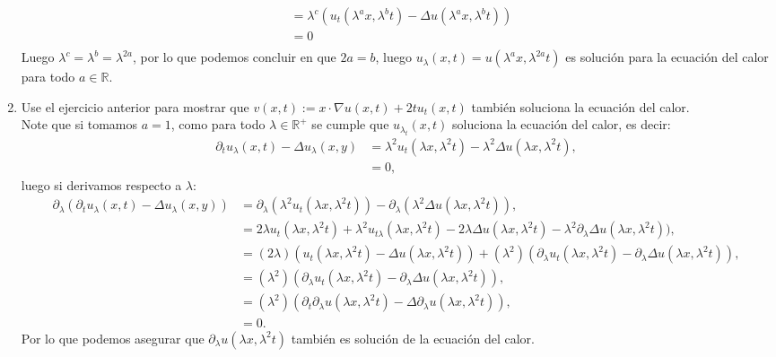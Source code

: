 \begin{homeworkProblem}
\begin{solucion}
\begin{enumerate}
\begin{align*}
          &=\lambda^c(u_{t}(\lambda^ax,\lambda^bt)-\Delta u(\lambda^ax,\lambda^bt))\\
          &=0\\
        \end{align*}
        Luego $\lambda^c=\lambda^b=\lambda^{2a}$, por lo que podemos concluir en que $2a=b$, luego $u_{\lambda}(x,t)=u(\lambda^{a}x,\lambda^{2a}t)$ es solución para la ecuación del calor para todo $a\in \mathbb{R}$.
        \demostrado
        \newpage
      \item Use el ejercicio anterior para mostrar que $v(x,t):=x\cdot \nabla u(x,t)+2tu_t(x,t)$ también soluciona la ecuación del calor.\\
        Note que si tomamos $a=1$, como para todo $\lambda\in\mathbb{R}^{+}$ se cumple que $u_{\lambda_{t}}(x,t)$ soluciona la ecuación del calor, es decir:
        \begin{align*}
          \partial_{t}u_{\lambda}(x,t)-\Delta u_{\lambda}(x,y)&=\lambda^2u_t(\lambda x,\lambda^2t)-\lambda^2\Delta u(\lambda x,\lambda^2 t),\\
          &=0,
        \end{align*}
        luego si derivamos respecto a $\lambda$:
        \begin{align*}
          \partial_{\lambda}(\partial_{t}u_{\lambda}(x,t)-\Delta u_{\lambda}(x,y))&=\partial_{\lambda}(\lambda^2u_t(\lambda x,\lambda^2t))-\partial_{\lambda}(\lambda^2\Delta u(\lambda x,\lambda^2 t)),\\
          &=2\lambda u_t(\lambda x,\lambda^2 t)+\lambda^2u_{t\lambda}(\lambda x,\lambda^2 t)-2\lambda\Delta u(\lambda x,\lambda^2 t)-\lambda^2\partial_{\lambda}\Delta u(\lambda x,\lambda^2 t)),\\
          &=(2\lambda)(u_t(\lambda x,\lambda^2 t)-\Delta u(\lambda x,\lambda^2 t))+(\lambda^2)(\partial_{\lambda}u_t(\lambda x,\lambda^2 t)-\partial_{\lambda}\Delta u(\lambda x,\lambda^2 t)),\\
          &=(\lambda^2)(\partial_{\lambda}u_t(\lambda x,\lambda^2 t)-\partial_{\lambda}\Delta u(\lambda x,\lambda^2 t)),\\
          &=(\lambda^2)(\partial_{t}\partial_{\lambda}u(\lambda x,\lambda^2 t)-\Delta \partial_{\lambda}u(\lambda x,\lambda^2 t)),\\
          &=0.
        \end{align*}
        Por lo que podemos asegurar que $\partial_{\lambda}u(\lambda x,\lambda^2 t)$ también es solución de la ecuación del calor.\\

\end{enumerate}
\end{solucion}
\end{homeworkProblem}
